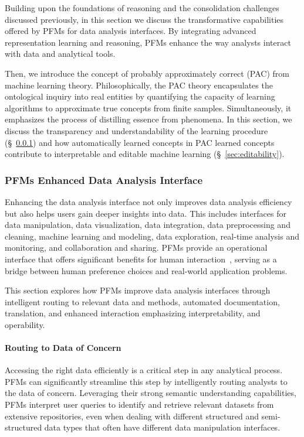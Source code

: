   Building upon the foundations of reasoning and the consolidation challenges discussed previously, in this section we discuss the transformative capabilities offered by PFMs for data analysis interfaces. By integrating advanced representation learning and reasoning, PFMs enhance the way analysts interact with data and analytical tools. 
  
  Then, we introduce the concept of probably approximately correct (PAC) from machine learning theory. Philosophically, the PAC theory encapsulates the ontological inquiry into real entities by quantifying the capacity of learning algorithms to approximate true concepts from finite samples. Simultaneously, it emphasizes the process of distilling essence from phenomena. In this section, we discuss the transparency and understandability of the learning procedure (\S~\ref{sec:interface})  and how automatically learned concepts in PAC learned concepts contribute to interpretable and editable machine learning (\S~\ref{sec:editability}).
  
  \subsubsection{PFMs Enhanced Data Analysis Interface}\label{sec:interface}
  
  Enhancing the data analysis interface not only improves data analysis efficiency but also helps users gain deeper insights into data. This includes interfaces for data manipulation, data visualization, data integration, data preprocessing and cleaning, machine learning and modeling, data exploration, real-time analysis and monitoring, and collaboration and sharing. PFMs provide an operational interface that offers significant benefits for human interaction~\cite{dubiel2024device}, serving as a bridge between human preference choices and real-world application problems.
  
  This section explores how PFMs improve data analysis interfaces through intelligent routing to relevant data and methods, automated documentation, translation, and enhanced interaction emphasizing interpretability,  and operability.
  
  \paragraph{Routing to Data of Concern}
  
  Accessing the right data efficiently is a critical step in any analytical process. PFMs can significantly streamline this step by intelligently routing analysts to the data of concern. Leveraging their strong semantic understanding capabilities, PFMs interpret user queries to identify and retrieve relevant datasets from extensive repositories, even when dealing with different structured and semi-structured data types that often have different data manipulation interfaces.
  
